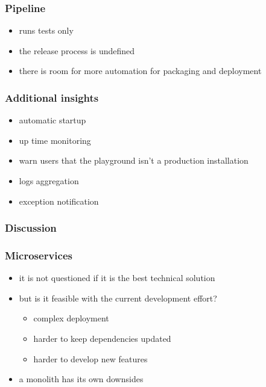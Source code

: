 \documentclass{beamer}
\begin{document}
  \begin{frame}
    \frametitle{Pipeline}

    \begin{itemize}
      \item runs tests only
      \item the release process is undefined
      \item there is room for more automation for packaging and deployment
    \end{itemize}
  \end{frame}

  \begin{frame}
    \frametitle{Additional insights}

    \begin{itemize}
      \item automatic startup
      \item up time monitoring
      \item warn users that the playground isn't a production installation
      \item logs aggregation
      \item exception notification
    \end{itemize}
  \end{frame}

  \begin{frame}
    \frametitle{Discussion}
    \frametitle{Microservices}

    \begin{itemize}
      \item it is not questioned if it is the best technical solution
      \item but is it feasible with the current development effort?
        \begin{itemize}
          \item complex deployment
          \item harder to keep dependencies updated
          \item harder to develop new features
        \end{itemize}
      \item a monolith has its own downsides
    \end{itemize}
  \end{frame}
\end{document}

